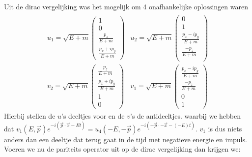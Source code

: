 \documentclass[../main.tex]{subfiles}
\begin{document}
Uit de dirac vergelijking was het mogelijk om 4 onafhankelijke oplossingen waren
\begin{equation}
    \begin{aligned}
        \label{eq:dirac_fermions}
        \begin{matrix}
            u_1 = \sqrt{E+m}
            \begin{pmatrix}
                1\\
                0\\
                \frac{p_z}{E+m}\\
                \frac{p_x + ip_y}{E+m} 
            \end{pmatrix} &
            u_2 = \sqrt{E+m}
            \begin{pmatrix}
                0\\
                1\\
                \frac{p_x - ip_y}{E+m}\\ 
                \frac{-p_z}{E+m}\\
            \end{pmatrix} \\
            v_2 = \sqrt{E+m}
            \begin{pmatrix}
                \frac{p_z}{E+m}\\
                \frac{p_x + ip_y}{E+m}\\ 
                1\\
                0
            \end{pmatrix} &
            v_1 = \sqrt{E+m}
            \begin{pmatrix}
                \frac{p_x - ip_y}{E+m} \\
                \frac{-p_z}{E+m}\\
                0\\
                1
            \end{pmatrix}
        \end{matrix}
    \end{aligned}
\end{equation}
Hierbij stellen de $u$'s deeltjes voor en de $v$'s de antideeltjes. waarbij we hebben dat $v_1(E,\vec{p})e^{-i(\vec{p}\cdot \vec{x}-Et)} = u_4(-E,-\vec{p})e^{-i(-\vec{p}\cdot -\vec{x}-(-E)t)}$. $v_1$ is dus niets anders dan een deeltje dat terug gaat in de tijd met negatieve energie en impuls. Voeren we nu de pariteits operator uit op de dirac vergelijking dan krijgen we:
\end{document}
